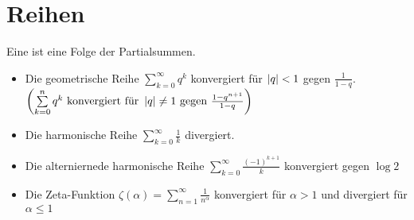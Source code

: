 \section{Reihen} 
	\begin{definition}
		Eine  ist eine Folge der Partialsummen.
	\end{definition}
		\begin{shortcut} \hfill
			\begin{itemize}
				\item Die geometrische Reihe $ \sum\limits_{k = 0}^{\infty} q^k $ konvergiert für $\left\vert q \right\vert < 1$ gegen $\frac{1}{1-q}$. $ \left( \sum\limits_{k = 0}^{n} q^k \text{ konvergiert für } \left\vert q \right\vert \neq 1 \text{ gegen } \frac{1-q^{n+1}}{1-q} \right)$
				\item Die harmonische Reihe $ \sum\limits_{k = 0}^{\infty} \frac{1}{k} $ divergiert.
				\item Die alterniernede harmonische Reihe $ \sum\limits_{k = 0}^{\infty} \frac{(-1)^{k + 1}}{k} $ konvergiert gegen $ \log 2$
				\item Die Zeta-Funktion $ \zeta(\alpha) = \sum\limits_{n = 1}^{\infty} \frac{1}{n^\alpha}$ konvergiert für $\alpha > 1$ und divergiert für $\alpha \leq 1$
			\end{itemize}
		\end{shortcut}

